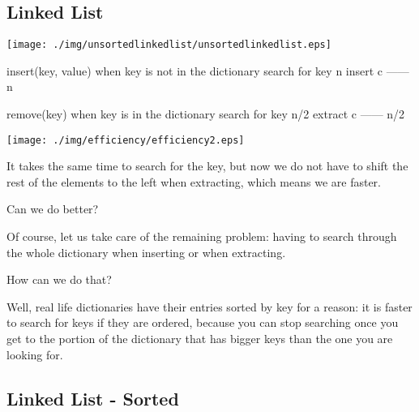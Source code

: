 \documentclass[a4paper, 9pt]{extarticle}
\begin{document}
\newpage

\subsection{Linked List}

\begin{center}
  \texttt{[image: ./img/unsortedlinkedlist/unsortedlinkedlist.eps]}
\end{center}

\begin{blackboard}
insert(key, value) when key is not in the dictionary
  search for key                              n
  insert                                      c
                                             ------
                                              n

remove(key) when key is in the dictionary
  search for key                              n/2
  extract                                     c
                                             ------
                                              n/2
\end{blackboard}

\begin{multicols}{2}
\begin{center}
  \texttt{[image: ./img/efficiency/efficiency2.eps]}
\end{center}
\columnbreak

It takes the same time to search for the key, but now we do not have to shift the
rest of the elements to the left when extracting, which means we are faster.

Can we do better?

Of course, let us take care of the remaining problem: having to search through the
whole dictionary when inserting or when extracting.

How can we do that?

Well, real life dictionaries have their entries sorted by key for a reason: it
is faster to search for keys if they are ordered, because you can stop
searching once you get to the portion of the dictionary that has bigger keys
than the one you are looking for.

\end{multicols}


\newpage

\subsection{Linked List - Sorted}
\end{document}
